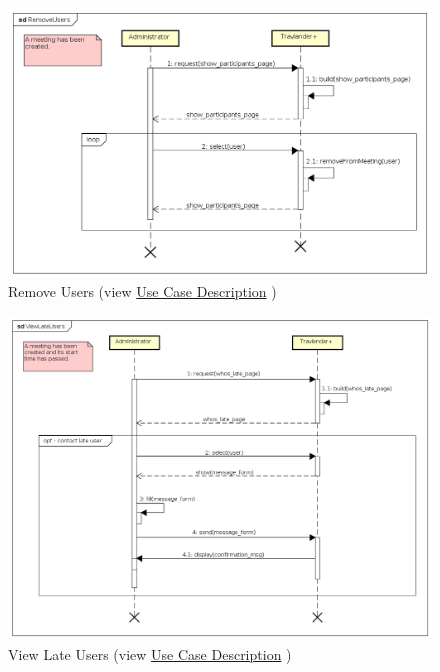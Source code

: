 \begin{figure}[H]
\centering\includegraphics[width=\textwidth]{Images/SequenceDiagrams/Admin/RemoveUsers.png}{}
\caption[Remove Users]{{Remove Users}\label{SeqDiagr:RemoveUsers} (view \hyperref[UseCaseDescr:RemoveUsers]{Use Case Description} )}
\end{figure}

\begin{figure}[H]
\centering\includegraphics[width=\textwidth]{Images/SequenceDiagrams/Admin/ViewLateUsers.png}{}
\caption[View Late Users]{{View Late Users}\label{SeqDiagr:LateUsers} (view \hyperref[UseCaseDescr:LateUsers]{Use Case Description} )}
\end{figure}

